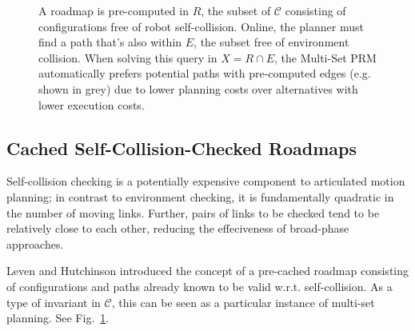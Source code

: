 \documentclass{report}
\begin{document}
\begin{figure}
\centering

\caption{A roadmap is pre-computed in $R$,
  the subset of $\mathcal{C}$ consisting of configurations free
  of robot self-collision.
  Online, the planner must find a path that's also within $E$,
  the subset free of environment collision.
  When solving this query in $X = R \cap E$,
  the Multi-Set PRM automatically prefers potential paths with
  pre-computed edges (e.g. shown in grey)
  due to lower planning costs over alternatives with lower
  execution costs.}
\label{fig:self-collision-example}
\end{figure}

\subsection{Cached Self-Collision-Checked Roadmaps}
\label{subsec:cached-self-valid}

Self-collision checking is a potentially expensive component to
articulated motion planning;
in contrast to environment checking,
it is fundamentally quadratic in the number of moving links.
Further, pairs of links to be checked
tend to be relatively close to each other,
reducing the effeciveness of broad-phase approaches.

Leven and Hutchinson \cite{leven2000changing}
introduced the concept of a pre-cached roadmap consisting of
configurations and paths already known to be valid w.r.t.
self-collision.
As a type of invariant in $\mathcal{C}$,
this can be seen as a particular instance of multi-set planning.
See Fig.~\ref{fig:self-collision-example}.
\end{document}
